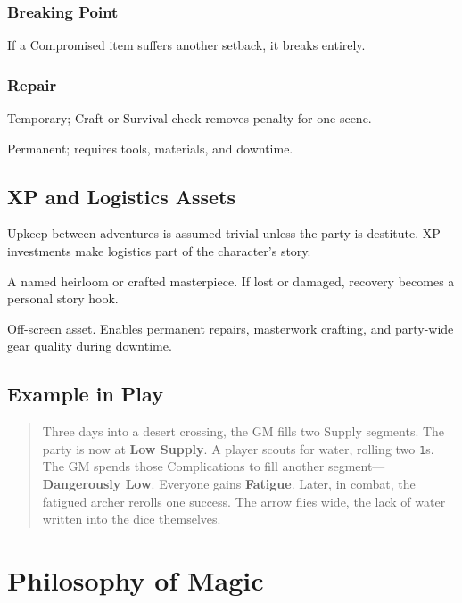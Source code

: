 \documentclass[12pt]{book}
\begin{document}
\subsection*{Breaking Point}
If a Compromised item suffers another setback, it breaks entirely.

\subsection*{Repair}
\begin{description}[leftmargin=2cm]
  \item[Field Repair:] Temporary; Craft or Survival check removes penalty for
    one scene.
  \item[Proper Repair:] Permanent; requires tools, materials, and downtime.
\end{description}

\section{XP and Logistics Assets}
Upkeep between adventures is assumed trivial unless the party is destitute.
XP investments make logistics part of the character’s story.

\begin{description}[leftmargin=2cm]
  \item[4 XP: Signature Weapon] A named heirloom or crafted masterpiece.
    If lost or damaged, recovery becomes a personal story hook.
  \item[8 XP: Superior Workshop] Off-screen asset. Enables permanent repairs,
    masterwork crafting, and party-wide gear quality during downtime.
\end{description}

\section{Example in Play}
\begin{quote}
Three days into a desert crossing, the GM fills two Supply segments. The party
is now at \textbf{Low Supply}.  
A player scouts for water, rolling two \texttt{1}s. The GM spends those
Complications to fill another segment—\textbf{Dangerously Low}. Everyone gains
\textbf{Fatigue}.  
Later, in combat, the fatigued archer rerolls one success. The arrow flies wide,
the lack of water written into the dice themselves.
\end{quote}

\chapter{Philosophy of Magic}
\end{document}
